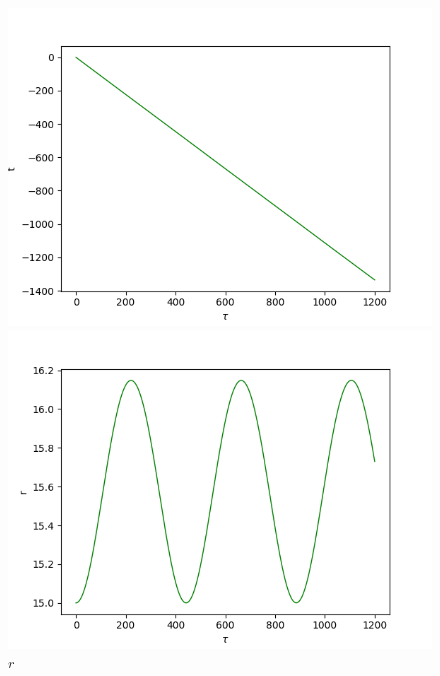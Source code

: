 \documentclass[10pt,a4paper]{report}
\begin{document}
\begin{figure}[!ht]
\begin{minipage}[b]{0.5\linewidth}
\centering
\includegraphics[width=\textwidth]{3a/t.png}
\caption{$t$}
\label{fig:figure1}
\end{minipage}
\hspace{0.5cm}
\begin{minipage}[b]{0.5\linewidth}
\centering
\includegraphics[width=\textwidth]{3a/r.png}
\caption{$r$}
\label{fig:figure2}
\end{minipage}
\end{figure}
\end{document}
